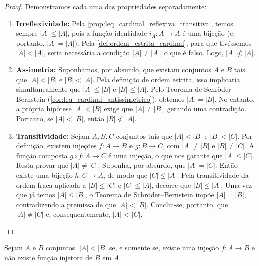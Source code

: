 \begin{proof}
    Demonstramos cada uma das propriedades separadamente:
    \begin{enumerate}
        \item \textbf{Irreflexividade:} Pela \autoref{prop:leq_cardinal_reflexiva_transitiva}, temos sempre \(|A| \leq |A|\), pois a função identidade \(i_A: A \to A\) é uma bijeção (e, portanto, \(|A| = |A|\)). Pela \autoref{def:ordem_estrita_cardinal}, para que tivéssemos \(|A| < |A|\), seria necessária a condição \(|A| \neq |A|\), o que é falso. Logo, \(|A| \not< |A|\).

        \item \textbf{Assimetria:} Suponhamos, por absurdo, que existam conjuntos \(A\) e \(B\) tais que \(|A| < |B|\) e \(|B| < |A|\). Pela definição de ordem estrita, isso implicaria simultaneamente que \(|A| \leq |B|\) e \(|B| \leq |A|\). Pelo Teorema de Schröder--Bernstein (\autoref{cor:leq_cardinal_antissimetrico}), obtemos \(|A| = |B|\). No entanto, a própria hipótese \(|A| < |B|\) exige que \(|A| \neq |B|\), gerando uma contradição. Portanto, se \(|A| < |B|\), então \(|B| \not< |A|\).

        \item \textbf{Transitividade:} Sejam \(A, B, C\) conjuntos tais que \(|A| < |B|\) e \(|B| < |C|\). Por definição, existem injeções \(f: A \to B\) e \(g: B \to C\), com \(|A| \neq |B|\) e \(|B| \neq |C|\). A função composta \(g \circ f: A \to C\) é uma injeção, o que nos garante que \(|A| \leq |C|\). Resta provar que \(|A| \neq |C|\). Suponha, por absurdo, que \(|A| = |C|\). Então existe uma bijeção \(h: C \to A\), de modo que \(|C| \leq |A|\). Pela transitividade da ordem fraca aplicada a \(|B| \leq |C|\) e \(|C| \leq |A|\), decorre que \(|B| \leq |A|\). Uma vez que já temos \(|A| \leq |B|\), o Teorema de Schröder--Bernstein impõe \(|A| = |B|\), contradizendo a premissa de que \(|A| < |B|\). Conclui-se, portanto, que \(|A| \neq |C|\) e, consequentemente, \(|A| < |C|\).
    \end{enumerate}
\end{proof}

\begin{lema}
    \label{lem:caracterizacao_ordem_estrita_sem_injecao}
    Sejam \(A\) e \(B\) conjuntos. \(|A| < |B|\) se, e somente se, existe uma injeção \(f: A \to B\) e não existe função injetora de \(B\) em \(A\).
\end{lema}

